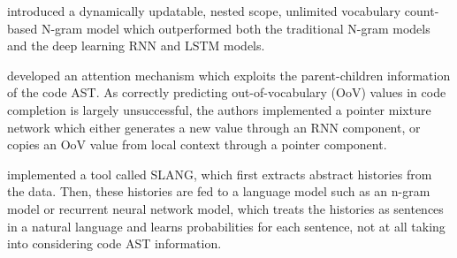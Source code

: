 \cite{Hell17a} introduced a dynamically updatable, nested scope, unlimited vocabulary count-based N-gram model which outperformed both the traditional N-gram models and the deep learning RNN and LSTM models.

\cite{Li17a} developed an attention mechanism which exploits the parent-children information of the code AST. As correctly predicting out-of-vocabulary (OoV) values in code completion is largely unsuccessful, the authors implemented a pointer mixture network which either generates a new value through an RNN component, or copies an OoV value from local context through a pointer component.

\cite{Rayc14a} implemented a tool called SLANG, which ﬁrst extracts abstract histories from the data. Then, these histories are fed to a language model such as an n-gram model or recurrent neural network model, which treats the histories as sentences in a natural language and learns probabilities for each sentence, not at all taking into considering code AST information.